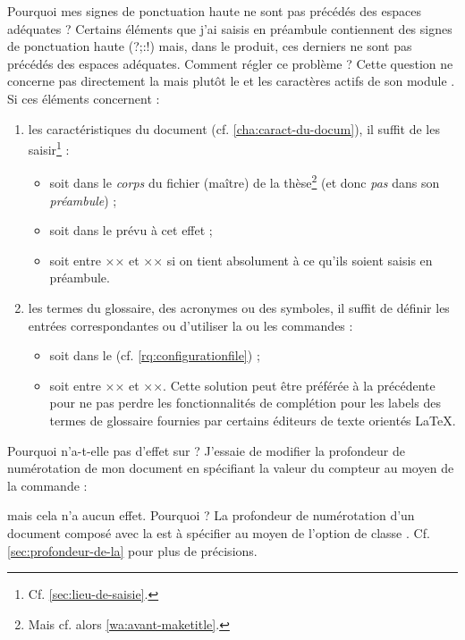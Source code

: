 \begin{dbfaq}{Pourquoi mes signes de ponctuation haute ne sont pas précédés des
    espaces adéquates ?}{}
  Certains éléments que j'ai saisis en préambule contiennent des signes de
  ponctuation haute ({\NoAutoSpacing?;:!}) mais, dans le \pdf produit, ces
  derniers ne sont pas précédés des espaces adéquates. Comment régler ce
  problème ?
  \tcblower
  Cette question ne concerne pas directement la \yatcl{} mais plutôt le
   et les caractères actifs de son module . Si
  ces éléments concernent :
  \begin{enumerate}
  \item les caractéristiques du document (cf. \vref{cha:caract-du-docum}), il
    suffit de les saisir\footnote{Cf. \vref{sec:lieu-de-saisie}.} :
    \begin{itemize}
    \item soit dans le \emph{corps} du fichier (maître) de la
      thèse\footnote{Mais cf. alors \vref{wa:avant-maketitle}.} (et donc
      \emph{pas} dans son \emph{préambule}) ;
    \item soit dans le \File{\characteristicsfile} prévu à cet effet ;
    \item soit entre ×× et ×× si on tient
      absolument à ce qu'ils soient saisis en préambule.
    \end{itemize}
  \item les termes du glossaire, des acronymes ou des symboles, il suffit de
    définir les entrées correspondantes ou d'utiliser la ou les commandes
     :
    \begin{itemize}
    \item soit dans le \File{\configurationfile}
      (cf. \vref{rq:configurationfile}) ;
    \item soit entre ×× et ××. Cette
      solution peut être préférée à la précédente pour ne pas perdre les
      fonctionnalités de complétion pour les labels des termes de glossaire
      fournies par certains éditeurs de texte orientés \LaTeX{}.
    \end{itemize}
  \end{enumerate}
\end{dbfaq}

\begin{dbfaq}{Pourquoi \protect{} n'a-t-elle pas
    d'effet sur \protect{} ?}{}
  J'essaie de modifier la profondeur de numérotation de mon document en
  spécifiant la valeur du compteur  au moyen de la
  commande :
\begin{preamblecode}
\end{preamblecode}
  mais cela n'a aucun effet. Pourquoi ?
  \tcblower
  La profondeur de numérotation d'un document composé avec la \yatcl{} est
  à spécifier au moyen de l'option de classe
  . Cf. \vref{sec:profondeur-de-la} pour plus de
  précisions.
\end{dbfaq}

